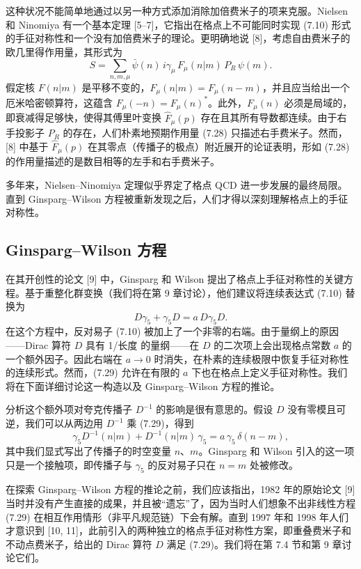 这种状况不能简单地通过以另一种方式添加消除加倍费米子的项来克服。Nielsen 和 Ninomiya 有一个基本定理 [5--7]，它指出在格点上不可能同时实现 (7.10) 形式的手征对称性和一个没有加倍费米子的理论。更明确地说 [8]，考虑自由费米子的欧几里得作用量，其形式为
\begin{equation}
  S = \sum_{n,m,\mu} \bar\psi(n)\,i\gamma_\mu\,F_\mu(n|m)\,P_R\,\psi(m) .
\end{equation}
假定核 $F(n|m)$ 是平移不变的，$F_\mu(n|m) = F_\mu(n-m)$，并且应当给出一个厄米哈密顿算符，这蕴含 $F_\mu(-n) = F_\mu(n)^*$。此外，$F_\mu(n)$ 必须是局域的，即衰减得足够快，使得其傅里叶变换 $\hat{F}_\mu(p)$ 存在且其所有导数都连续。由于右手投影子 $P_R$ 的存在，人们朴素地预期作用量 (7.28) 只描述右手费米子。然而，[8] 中基于 $\hat{F}_\mu(p)$ 在其零点（传播子的极点）附近展开的论证表明，形如 (7.28) 的作用量描述的是数目相等的左手和右手费米子。

多年来，Nielsen--Ninomiya 定理似乎界定了格点 QCD 进一步发展的最终局限。直到 Ginsparg--Wilson 方程被重新发现之后，人们才得以深刻理解格点上的手征对称性。

\subsection{Ginsparg--Wilson 方程}

在其开创性的论文 [9] 中，Ginsparg 和 Wilson 提出了格点上手征对称性的关键方程。基于重整化群变换（我们将在第 9 章讨论），他们建议将连续表达式 (7.10) 替换为
\begin{equation}
  D\gamma_5 + \gamma_5 D = a\,D\gamma_5 D .
\end{equation}
在这个方程中，反对易子 (7.10) 被加上了一个非零的右端。由于量纲上的原因——Dirac 算符 $D$ 具有 1/长度 的量纲——在 $D$ 的二次项上会出现格点常数 $a$ 的一个额外因子。因此右端在 $a \to 0$ 时消失，在朴素的连续极限中恢复手征对称性的连续形式。然而，(7.29) 允许在有限的 $a$ 下也在格点上定义手征对称性。我们将在下面详细讨论这一构造以及 Ginsparg--Wilson 方程的推论。

分析这个额外项对夸克传播子 $D^{-1}$ 的影响是很有意思的。假设 $D$ 没有零模且可逆，我们可以从两边用 $D^{-1}$ 乘 (7.29)，得到
\begin{equation}
  \gamma_5 D^{-1}(n|m) + D^{-1}(n|m)\,\gamma_5 = a\,\gamma_5\,\delta(n-m),
\end{equation}
其中我们显式写出了传播子的时空变量 $n$、$m$。Ginsparg 和 Wilson 引入的这一项只是一个接触项，即传播子与 $\gamma_5$ 的反对易子只在 $n = m$ 处被修改。

在探索 Ginsparg--Wilson 方程的推论之前，我们应该指出，1982 年的原始论文 [9] 当时并没有产生直接的成果，并且被``遗忘''了，因为当时人们想象不出非线性方程 (7.29) 在相互作用情形（非平凡规范链）下会有解。直到 1997 年和 1998 年人们才意识到 [10, 11]，此前引入的两种独立的格点手征对称性方案，即重叠费米子和不动点费米子，给出的 Dirac 算符 $D$ 满足 (7.29)。我们将在第 7.4 节和第 9 章讨论它们。

